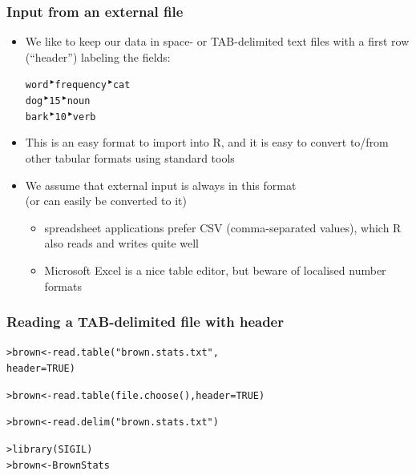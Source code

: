 \documentclass[t]{beamer} %
\begin{document}
{
\newcommand{\tri}{{\color{secondary!60!white}\scriptsize $\,^{\blacktriangleright}$}}
\begin{frame}[fragile]
  \frametitle{Input from an external file}

  \begin{itemize}
  \item We like to keep our data in space- or TAB-delimited text files with a
    first row (``header'') labeling the fields:
\begin{alltt}
word\tri frequency\tri cat
dog\tri  15\tri        noun
bark\tri 10\tri        verb 
\end{alltt}
  \item This is an easy format to import into R, and it is easy to
    convert to/from other tabular formats using standard tools
  \item We assume that external input is always in this format\\ (or can
    easily be converted to it)
    \begin{itemize}
    \item spreadsheet applications prefer CSV (comma-separated values),
      which R also reads and writes quite well
    \item Microsoft Excel is a nice table editor, but beware of localised
      number formats
    \end{itemize}
  \end{itemize}

\end{frame}
}


\begin{frame}[fragile]
  \frametitle{Reading a TAB-delimited file with header}
  
\begin{alltt}
> brown <- read.table("brown.stats.txt",
  header=TRUE)

> brown <- read.table(file.choose(), header=TRUE)

> brown <- read.delim("brown.stats.txt")

> library(SIGIL)
> brown <- BrownStats
\end{alltt}

\end{frame}
\end{document}
